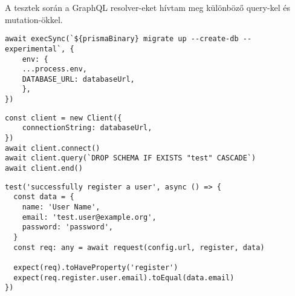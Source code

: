 A tesztek során a GraphQL resolver-eket hívtam meg különböző query-kel és mutation-ökkel.

\begin{lstlisting}[style=ES6, caption={Teszt atadbázis migrció}]
await execSync(`${prismaBinary} migrate up --create-db --experimental`, {
    env: {
    ...process.env,
    DATABASE_URL: databaseUrl,
    },
})
\end{lstlisting}

\begin{lstlisting}[style=ES6, caption=Teszt adatbázis törlése]    
const client = new Client({
    connectionString: databaseUrl,
})
await client.connect()
await client.query(`DROP SCHEMA IF EXISTS "test" CASCADE`)
await client.end()
\end{lstlisting}


\begin{lstlisting}[style=ES6, caption=Regisztráció első teszt eset]    
test('successfully register a user', async () => {
  const data = {
    name: 'User Name',
    email: 'test.user@example.org',
    password: 'password',
  }
  const req: any = await request(config.url, register, data)

  expect(req).toHaveProperty('register')
  expect(req.register.user.email).toEqual(data.email)
})
\end{lstlisting}
